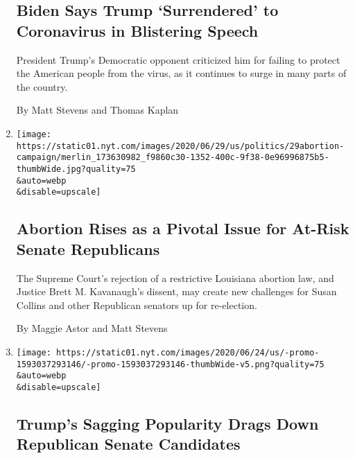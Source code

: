 \begin{enumerate}
  \hypertarget{biden-says-trump-surrendered-to-coronavirus-in-blistering-speech}{%
  \subsection{Biden Says Trump `Surrendered' to Coronavirus in
  Blistering
  Speech}\label{biden-says-trump-surrendered-to-coronavirus-in-blistering-speech}}

  President Trump's Democratic opponent criticized him for failing to
  protect the American people from the virus, as it continues to surge
  in many parts of the country.

  By Matt Stevens and Thomas Kaplan
\item
  \href{/2020/06/29/us/politics/2020-senate-abortion-susan-collins.html}{}

  \texttt{[image: https://static01.nyt.com/images/2020/06/29/us/politics/29abortion-campaign/merlin\_173630982\_f9860c30-1352-400c-9f38-0e96996875b5-thumbWide.jpg?quality=75\\\&auto=webp\\\&disable=upscale]}

  \hypertarget{abortion-rises-as-a-pivotal-issue-for-at-risk-senate-republicans}{%
  \subsection{Abortion Rises as a Pivotal Issue for At-Risk Senate
  Republicans}\label{abortion-rises-as-a-pivotal-issue-for-at-risk-senate-republicans}}

  The Supreme Court's rejection of a restrictive Louisiana abortion law,
  and Justice Brett M. Kavanaugh's dissent, may create new challenges
  for Susan Collins and other Republican senators up for re-election.

  By Maggie Astor and Matt Stevens
\item
  \href{/2020/06/25/us/politics/trump-senate-republicans-poll.html}{}

  \texttt{[image: https://static01.nyt.com/images/2020/06/24/us/-promo-1593037293146/-promo-1593037293146-thumbWide-v5.png?quality=75\\\&auto=webp\\\&disable=upscale]}

  \hypertarget{trumps-sagging-popularity-drags-down-republican-senate-candidates}{%
  \subsection{Trump's Sagging Popularity Drags Down Republican Senate
  Candidates}\label{trumps-sagging-popularity-drags-down-republican-senate-candidates}}


\end{enumerate}

